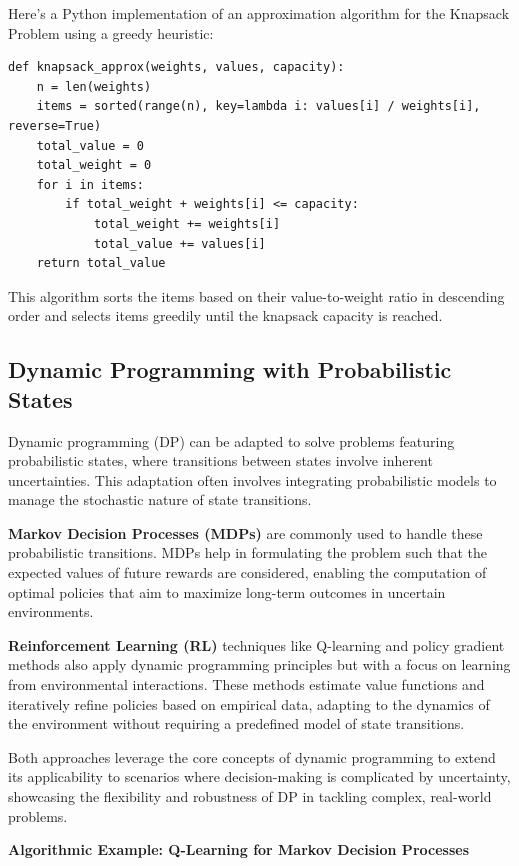 \documentclass[12pt]{book} %
\begin{document}
Here's a Python implementation of an approximation algorithm for the Knapsack Problem using a greedy heuristic:
\FloatBarrier
\begin{verbatim}
def knapsack_approx(weights, values, capacity):
    n = len(weights)
    items = sorted(range(n), key=lambda i: values[i] / weights[i], reverse=True)
    total_value = 0
    total_weight = 0
    for i in items:
        if total_weight + weights[i] <= capacity:
            total_weight += weights[i]
            total_value += values[i]
    return total_value
\end{verbatim}

This algorithm sorts the items based on their value-to-weight ratio in descending order and selects items greedily until the knapsack capacity is reached.

\subsection{Dynamic Programming with Probabilistic States}

Dynamic programming (DP) can be adapted to solve problems featuring probabilistic states, where transitions between states involve inherent uncertainties. This adaptation often involves integrating probabilistic models to manage the stochastic nature of state transitions.

\textbf{Markov Decision Processes (MDPs)} are commonly used to handle these probabilistic transitions. MDPs help in formulating the problem such that the expected values of future rewards are considered, enabling the computation of optimal policies that aim to maximize long-term outcomes in uncertain environments.

\textbf{Reinforcement Learning (RL)} techniques like Q-learning and policy gradient methods also apply dynamic programming principles but with a focus on learning from environmental interactions. These methods estimate value functions and iteratively refine policies based on empirical data, adapting to the dynamics of the environment without requiring a predefined model of state transitions.

Both approaches leverage the core concepts of dynamic programming to extend its applicability to scenarios where decision-making is complicated by uncertainty, showcasing the flexibility and robustness of DP in tackling complex, real-world problems.


\textbf{Algorithmic Example: Q-Learning for Markov Decision Processes}
\end{document}
